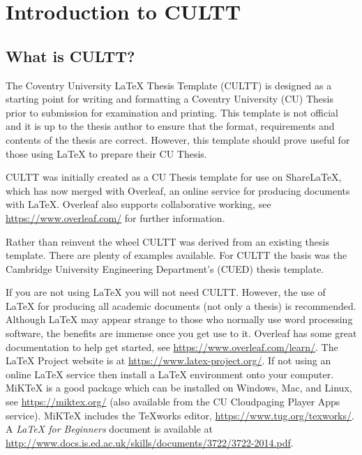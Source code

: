 
\chapter{Introduction to CULTT}  %

\ifpdf
    \graphicspath{{Chapter1/Figs/Raster/}{Chapter1/Figs/PDF/}{Chapter1/Figs/}}
\else
    \graphicspath{{Chapter1/Figs/Vector/}{Chapter1/Figs/}}
\fi

\section{What is CULTT?} %

The Coventry University \LaTeX{} Thesis Template (CULTT) is designed as a starting point for writing and formatting a Coventry University (CU) Thesis prior to submission for examination and printing. This template is not official and it is up to the thesis author to ensure that the format, requirements and contents of the thesis are correct. However, this template should prove useful for those using \LaTeX{} to prepare their CU Thesis.

CULTT was initially created as a CU Thesis template for use on ShareLaTeX, which has now merged with Overleaf, an online service for producing documents with \LaTeX{}. Overleaf also supports collaborative working, see \url{https://www.overleaf.com/} for further information. 

Rather than reinvent the wheel CULTT was derived from an existing thesis template. There are plenty of examples available. For CULTT the basis was the Cambridge University Engineering Department's (CUED) thesis template.


If you are not using \LaTeX{} you will not need CULTT. However, the use of \LaTeX{} for producing all academic documents (not only a thesis) is recommended. Although \LaTeX{} may appear strange to those who normally use word processing software, the benefits are immense once you get use to it. Overleaf has some great documentation to help get started, see \url{https://www.overleaf.com/learn/}. The \LaTeX{} Project website is at \url{https://www.latex-project.org/}. If not using an online \LaTeX{} service then install a \LaTeX{} environment onto your computer. MiKTeX is a good package which can be installed on Windows, Mac, and Linux, see \url{https://miktex.org/} (also available from the CU Cloudpaging Player Apps service). MiKTeX includes the TeXworks editor, \url{https://www.tug.org/texworks/}. A \emph{\LaTeX{} for Beginners} document is available at \url{http://www.docs.is.ed.ac.uk/skills/documents/3722/3722-2014.pdf}.

